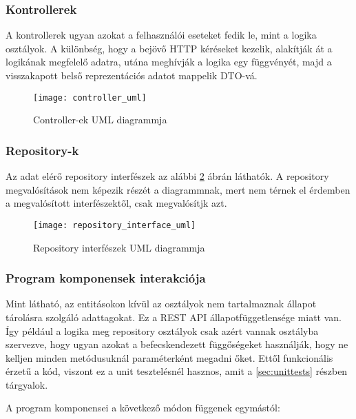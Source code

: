\subsubsection{Kontrollerek}

A kontrollerek ugyan azokat a felhasználói eseteket fedik le, mint a logika osztályok. A különbség, hogy a bejövő HTTP kéréseket kezelik, alakítják át a logikának megfelelő adatra, utána meghívják a logika egy függvényét, majd a visszakapott belső reprezentációs adatot mappelik DTO-vá.

\begin{figure}[H]
	\centering
	\texttt{[image: controller\_uml]}
	\caption{Controller-ek UML diagrammja}
	\label{fig:controllers}
\end{figure}

\clearpage

\subsubsection{Repository-k}

Az adat elérő repository interfészek az alábbi \ref{fig:repoInterfaces} ábrán láthatók.
A repository megvalósítások nem képezik részét a diagrammnak, mert nem térnek el érdemben a megvalósított interfészektől, csak megvalósítjk azt.

\begin{figure}[H]
	\centering
	\texttt{[image: repository\_interface\_uml]}
	\caption{Repository interfészek UML diagrammja}
	\label{fig:repoInterfaces}
\end{figure}

\clearpage

\subsubsection{Program komponensek interakciója}

Mint látható, az entitásokon kívül az osztályok nem tartalmaznak állapot tárolásra szolgáló adattagokat. Ez a REST API állapotfüggetlensége miatt van. Így például a logika meg repository osztályok csak azért vannak osztályba szervezve, hogy ugyan azokat a befecskendezett függőségeket használják, hogy ne kelljen minden metódusuknál paraméterként megadni őket. Ettől funkcionális érzetű a kód, viszont ez a unit tesztelésnél hasznos, amit a \ref{sec:unittests} részben tárgyalok.

A program komponensei a következő módon függenek egymástól:

